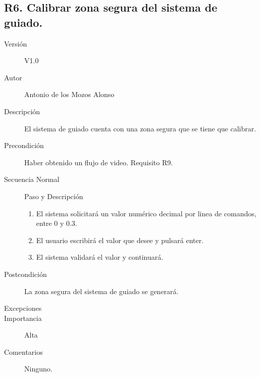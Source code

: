 \subsection{R6. Calibrar zona segura del sistema de guiado.}
\begin{description}
	\item [Versión] V1.0
	\item [Autor] Antonio de los Mozos Alonso
	\item [Descripción] El sistema de guiado cuenta con una zona segura que se tiene que calibrar. 
	\item [Precondición] Haber obtenido un flujo de video. Requisito R9.
	\item [Secuencia Normal] Paso y Descripción
		\begin{enumerate}
			\item El sistema solicitará un valor numérico decimal por linea de comandos, entre 0 y 0.3.
			\item El usuario escribirá el valor que desee y pulsará enter.
			\item El sistema validará el valor y continuará.
		\end{enumerate}
	\item [Postcondición] La zona segura del sistema de guiado se generará.
	\item [Excepciones] 
	\item [Importancia] Alta
	\item [Comentarios] Ninguno.
\end{description}

